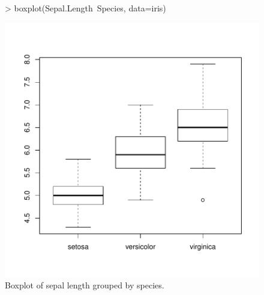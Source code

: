 \documentclass[a4paper]{article}
\begin{document}
\begin{figure}[htbp]
  \begin{center}
\begin{Schunk}
\begin{Sinput}
> boxplot(Sepal.Length~Species, data=iris)
\end{Sinput}
\end{Schunk}
\includegraphics{Sweave-test-1-007}
    \caption{Boxplot of sepal length grouped by species.}
  \end{center}
\end{figure}
\end{document}
